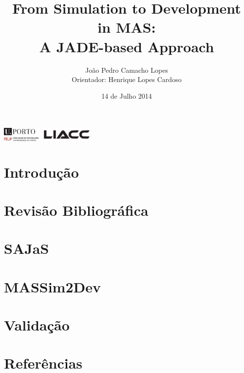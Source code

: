 \documentclass[xcolor=x11names,compress]{beamer}
\title{\texorpdfstring{From Simulation to Development in MAS:\\
		A JADE-based Approach}{}}
\author{\texorpdfstring{João Pedro Camacho Lopes\\
		Orientador: Henrique Lopes Cardoso}{}}
\renewcommand{\(}{\begin{columns}}
\renewcommand{\)}{\end{columns}}
\newcommand{\<}[1]{\begin{column}{#1}}
\renewcommand{\>}{\end{column}}
\begin{document}
\begin{frame}
\includegraphics[height=0.7cm]{figures/uporto-feup.pdf}\\

\vspace{1cm}

\date{14 de Julho 2014}
\titlepage
\end{frame}

\section{Introdução}


\section{Revisão Bibliográfica}


\section{SAJaS}


\section{MASSim2Dev}


\section{Validação}


\section{Referências}

\end{document}
